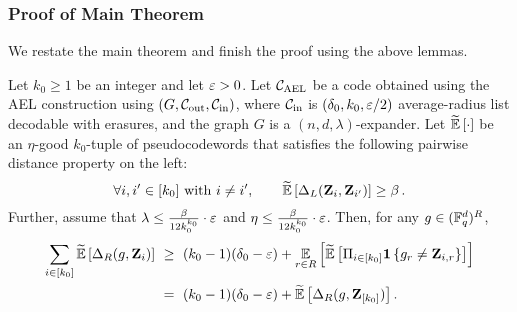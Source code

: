 	
\subsubsection{Proof of Main Theorem}	

We restate the main theorem and finish the proof using the above lemmas.

\begin{theorem}
	Let $k_0\geq 1$ be an integer and let $\varepsilon > 0$. Let ${ {\mathcal C}_{\mathrm{AEL}} }$ be a
code obtained using the AEL construction using $(G,{\mathcal C}_{\mathrm{out}}, {\mathcal C}_{\mathrm{in}})$, where ${\mathcal C}_{\mathrm{in}}$ is $(\delta_0, k_0, \varepsilon/2)$ average-radius list decodable with erasures, and the graph $G$ is a $(n,d,\lambda)$-expander. 
	Let $\tildeEx{\cdot}$ be an $\eta$-good $k_0$-tuple of pseudocodewords that satisfies the following pairwise distance property on the left:
	\[
		\forall i,i'\in [k_0] \text{ with } i\neq i', \qquad \tildeEx{\Delta_L(\zee_i, \zee_{i'})} \geq \beta\mper
	\]
	Further, assume that $\lambda \leq \frac{\beta}{12k_0^{k_0}}\cdot \varepsilon$ and $\eta \leq \frac{\beta}{12k_0^{k_0}}\cdot \varepsilon$.	Then, for any $g \in ({\mathbb F}_q^d)^R$,
	\begin{align*}
	\sum_{i\in [k_0]} \tildeEx{\Delta_R(g,\zee_i)} ~&\geq~ (k_0-1)(\delta_0-\eps) + \Ex{\ri \in R}{\tildeEx{ \Pi_{i\in[k_0]} \indi{g_{\ri} \neq \zee_{i,\ri}} }} \\
	~&=~ (k_0-1)(\delta_0 -\eps) + \tildeEx{\Delta_R(g,\zee_{[k_0]})}.
	\end{align*}
%
\end{theorem}

